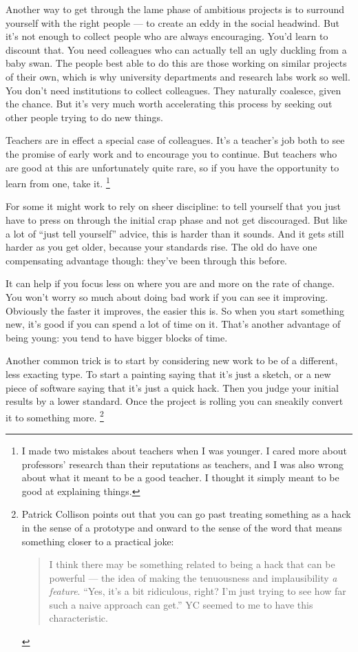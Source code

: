 Another way to get through the lame phase of ambitious projects is to
surround yourself with the right people --- to create an eddy in the
social headwind. But it's not enough to collect people who are always
encouraging. You'd learn to discount that. You need colleagues who can
actually tell an ugly duckling from a baby swan. The people best able to
do this are those working on similar projects of their own, which is why
university departments and research labs work so well. You don't need
institutions to collect colleagues. They naturally coalesce, given the
chance. But it's very much worth accelerating this process by seeking
out other people trying to do new things.

Teachers are in effect a special case of colleagues. It's a teacher's
job both to see the promise of early work and to encourage you to
continue. But teachers who are good at this are unfortunately quite
rare, so if you have the opportunity to learn from one, take it.
\footnote{I made two mistakes about teachers when I was younger. I cared
more about professors' research than their reputations as teachers, and
I was also wrong about what it meant to be a good teacher. I thought it
simply meant to be good at explaining things.}

For some it might work to rely on sheer discipline: to tell yourself
that you just have to press on through the initial crap phase and not
get discouraged. But like a lot of ``just tell yourself'' advice, this
is harder than it sounds. And it gets still harder as you get older,
because your standards rise. The old do have one compensating advantage
though: they've been through this before.

It can help if you focus less on where you are and more on the rate of
change. You won't worry so much about doing bad work if you can see it
improving. Obviously the faster it improves, the easier this is. So when
you start something new, it's good if you can spend a lot of time on it.
That's another advantage of being young: you tend to have bigger blocks
of time.

Another common trick is to start by considering new work to be of a
different, less exacting type. To start a painting saying that it's just
a sketch, or a new piece of software saying that it's just a quick hack.
Then you judge your initial results by a lower standard. Once the
project is rolling you can sneakily convert it to something more.
\footnote{Patrick Collison points out that you can go past treating
something as a hack in the sense of a prototype and onward to the sense
of the word that means something closer to a practical joke:

\begin{quote}
I think there may be something related to being a hack that can be
powerful --- the idea of making the tenuousness and implausibility
\emph{a feature}. ``Yes, it's a bit ridiculous, right? I'm just trying
to see how far such a naive approach can get.'' YC seemed to me to have
this characteristic.
\end{quote}}


